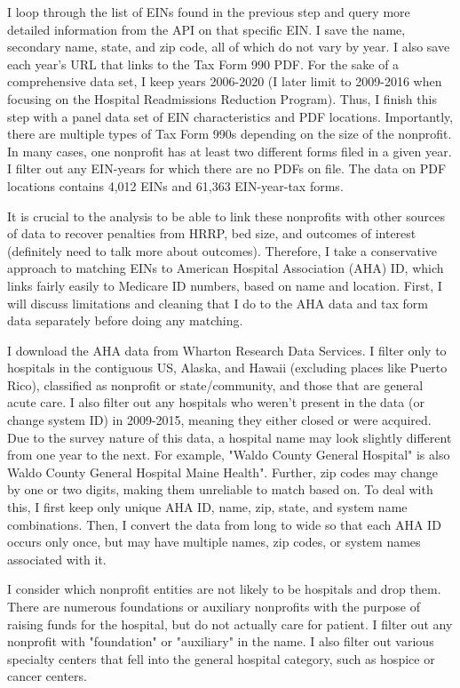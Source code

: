 \documentclass[12pt]{article}
\begin{document}
I loop through the list of EINs found in the previous step and query more detailed information from the API on that specific EIN. I save the name, secondary name, state, and zip code, all of which do not vary by year. I also save each year's URL that links to the Tax Form 990 PDF. For the sake of a comprehensive data set, I keep years 2006-2020 (I later limit to 2009-2016 when focusing on the Hospital Readmissions Reduction Program). Thus, I finish this step with a panel data set of EIN characteristics and PDF locations. Importantly, there are multiple types of Tax Form 990s depending on the size of the nonprofit. In many cases, one nonprofit has at least two different forms filed in a given year. I filter out any EIN-years for which there are no PDFs on file. The data on PDF locations contains 4,012 EINs and 61,363 EIN-year-tax forms.

It is crucial to the analysis to be able to link these nonprofits with other sources of data to recover penalties from HRRP, bed size, and outcomes of interest (definitely need to talk more about outcomes). Therefore, I take a conservative approach to matching EINs to American Hospital Association (AHA) ID, which links fairly easily to Medicare ID numbers, based on name and location. First, I will discuss limitations and cleaning that I do to the AHA data and tax form data separately before doing any matching. 

I download the AHA data from Wharton Research Data Services. I filter only to hospitals in the contiguous US, Alaska, and Hawaii (excluding places like Puerto Rico), classified as nonprofit or state/community, and those that are general acute care. I also filter out any hospitals who weren't present in the data (or change system ID) in 2009-2015, meaning they either closed or were acquired. Due to the survey nature of this data, a hospital name may look slightly different from one year to the next. For example, "Waldo County General Hospital" is also Waldo County General Hospital Maine Health". Further, zip codes may change by one or two digits, making them unreliable to match based on. To deal with this, I first keep only unique AHA ID, name, zip, state, and system name combinations. Then, I convert the data from long to wide so that each AHA ID occurs only once, but may have multiple names, zip codes, or system names associated with it.

I consider which nonprofit entities are not likely to be hospitals and drop them. There are numerous foundations or auxiliary nonprofits with the purpose of raising funds for the hospital, but do not actually care for patient. I filter out any nonprofit with "foundation" or "auxiliary" in the name. I also filter out various specialty centers that fell into the general hospital category, such as hospice or cancer centers. 
\end{document}
